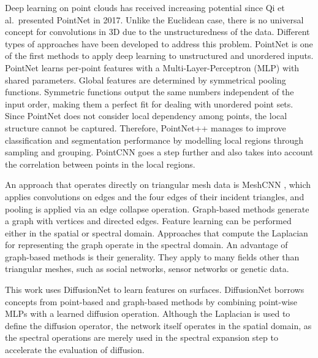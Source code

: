 \documentclass[class=article, crop=false]{standalone}
\begin{document}
Deep learning on point clouds has received increasing potential since Qi et al.\ presented PointNet \cite{Qi2017} in 2017. %
Unlike the Euclidean case, there is no universal concept for convolutions in 3D due to the unstructuredness of the data. Different types of approaches have been developed to address this problem.
PointNet is one of the first methods to apply deep learning to unstructured and unordered inputs. PointNet learns per-point features with a Multi-Layer-Perceptron (MLP) with shared parameters. Global features are determined by symmetrical pooling functions. Symmetric functions output the same numbers independent of the input order, making them a perfect fit for dealing with unordered point sets.
Since PointNet does not consider local dependency among points, the local structure cannot be captured. Therefore, PointNet++ \cite{Qi2017b} manages to improve classification and segmentation performance by modelling local regions through sampling and grouping. PointCNN \cite{Li2018} goes a step further and also takes into account the correlation between points in the local regions.

An approach that operates directly on triangular mesh data is MeshCNN \cite{Hanocka2019}, which applies convolutions on edges and the four edges of their incident triangles, and pooling is applied via an edge collapse operation.
Graph-based methods generate a graph with vertices and directed edges. Feature learning can be performed either in the spatial or spectral domain. Approaches that compute the Laplacian for representing the graph operate in the spectral domain. An advantage of graph-based methods is their generality. They apply to many fields other than triangular meshes, such as social networks, sensor networks or genetic data.

This work uses DiffusionNet \cite{sharp2022diffusion} to learn features on surfaces. DiffusionNet borrows concepts from point-based and graph-based methods by combining point-wise MLPs with a learned diffusion operation. Although the Laplacian is used to define the diffusion operator, the network itself operates in the spatial domain, as the spectral operations are merely used in the spectral expansion step to accelerate the evaluation of diffusion.



\end{document}
